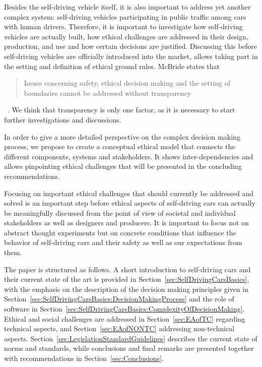 Besides the self-driving vehicle itself, it is also important to address  yet another complex system: self-driving vehicles participating in public traffic among cars with human drivers. Therefore, it is important to investigate how self-driving vehicles are actually built, how ethical challenges are addressed in their design, production, and use and how certain decisions are justified. Discussing this before self-driving vehicles are officially introduced into the market, allows taking part in the setting and definition of ethical ground rules. McBride states that \blockquote{Issues concerning safety, ethical decision making and the setting of boundaries cannot be addressed without transparency}~\cite{McBride:2016:EDC:2874239.2874265}. We think that transparency is only one factor, as it is necessary to start further investigations and discussions. 

In order to give a more detailed perspective on the complex decision making process, we propose to create a conceptual ethical model that connects the different components, systems and stakeholders. It shows inter-dependencies and allows pinpointing ethical challenges that will be presented in the concluding recommendations.

Focusing on important ethical challenges that should currently be addressed and solved is an important step before ethical aspects of self-driving cars can actually be meaningfully discussed from the point of view of societal and individual stakeholders as well as designers and producers. It is important to focus not on abstract thought experiments but on concrete conditions that influence the behavior of self-driving cars and their safety as well as our expectations from them.

The paper is structured as follows. A short introduction to self-driving cars and their current state of the art is provided in Section~\ref{sec:SelfDrivingCarsBasics}, with the emphasis on the description of the decision making principles given in Section~\ref{sec:SelfDrivingCarsBasics:DecisionMakingProcess} and the role of software in Section~\ref{sec:SelfDrivingCarsBasics:ComplexityOfDecisionMaking}. Ethical and social challenges are addressed in Section~\ref{sec:EAofTC} regarding technical aspects, and Section~\ref{sec:EAofNONTC} addressing non-technical aspects. Section~\ref{sec:LegislationStandardGuidelines} describes the current state of norms and standards, while conclusions and final remarks are  presented together with recommendations in Section~\ref{sec:Conclusions}.


